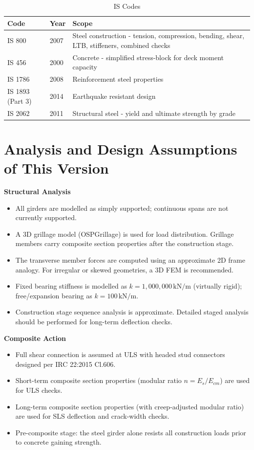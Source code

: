 \documentclass[12pt,a4paper]{report}
\numberwithin{figure}{chapter}
\begin{document}
\begin{table}[H]
\centering
{}
\caption{IS Codes}
\begin{tabular}{|C{2.55cm}|C{1.28cm}|L{10.3cm}|}
\hline
\textbf{Code} & \textbf{Year} & \textbf{Scope} \\
\hline
IS 800 & 2007 & Steel construction - tension, compression, bending, shear, LTB, stiffeners, combined checks \\
\hline
IS 456 & 2000 & Concrete - simplified stress-block for deck moment capacity \\
\hline
IS 1786 & 2008 & Reinforcement steel properties \\
\hline
IS 1893 (Part 3) & 2014 & Earthquake resistant design \\
\hline
IS 2062 & 2011 & Structural steel - yield and ultimate strength by grade \\
\hline
\end{tabular}
\end{table}

\clearpage
\section{Analysis and Design Assumptions of This Version}
\label{sec:analysis_design_assumptions}

\textbf{Structural Analysis}

\begin{itemize}
    \item All girders are modelled as simply supported; continuous spans are not currently supported.
    \item A 3D grillage model (OSPGrillage) is used for load distribution. Grillage members carry composite section properties after the construction stage.
    \item The transverse member forces are computed using an approximate 2D frame analogy. For irregular or skewed geometries, a 3D FEM is recommended.
    \item Fixed bearing stiffness is modelled as $k = 1{,}000{,}000 \,\text{kN/m}$ (virtually rigid); free/expansion bearing as $k = 100 \, \text{kN/m}$.
    \item Construction stage sequence analysis is approximate. Detailed staged analysis should be performed for long-term deflection checks.
\end{itemize}

\textbf{Composite Action}

\begin{itemize}
    \item Full shear connection is assumed at ULS with headed stud connectors designed per IRC 22:2015 Cl.606.
    \item Short-term composite section properties (modular ratio $n = E_s/E_{cm}$) are used for ULS checks.
    \item Long-term composite section properties (with creep-adjusted modular ratio) are used for SLS deflection and crack-width checks.
    \item Pre-composite stage: the steel girder alone resists all construction loads prior to concrete gaining strength.
\end{itemize}
\end{document}
